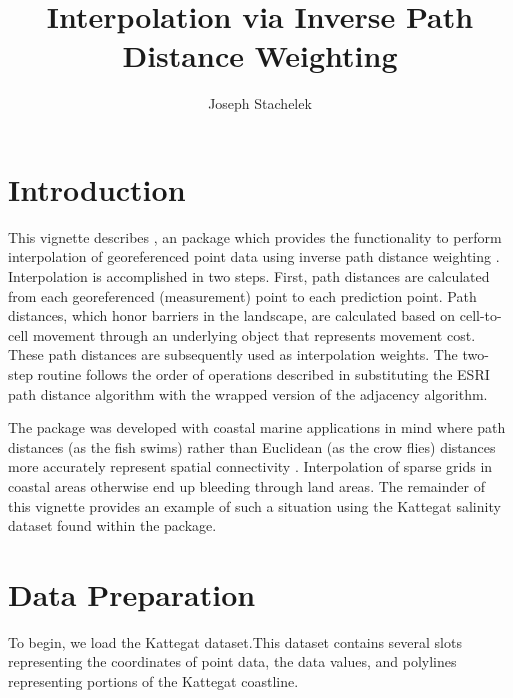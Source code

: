 \documentclass[nojss,shortnames]{jss}
\author{Joseph Stachelek}
\title{Interpolation via Inverse Path Distance Weighting}
\begin{document}


\section{Introduction}

This vignette describes , an  package which provides the functionality to perform interpolation of georeferenced point data using inverse path distance weighting \citep{suominen2010}. Interpolation is accomplished in two steps. First, path distances are calculated from each georeferenced (measurement) point to each prediction point. Path distances, which honor barriers in the landscape, are calculated based on cell-to-cell movement through an underlying   object \citep{hij2014} that represents movement cost. These path distances are subsequently used as interpolation weights. The two-step routine follows the order of operations described in \citet{suominen2010} substituting the ESRI path distance algorithm \citep{mitchell2012} with the  \citep{etten2014} wrapped version of the  \citep{csardi2006} adjacency algorithm.    

The  package was developed with coastal marine applications in mind where path distances (as the fish swims) rather than Euclidean (as the crow flies) distances more accurately represent spatial connectivity \citep{little1997}. Interpolation of sparse grids in coastal areas otherwise end up bleeding through land areas. The remainder of this vignette provides an example of such a situation using the Kattegat salinity dataset \citep{diggle2006} found within the  package.

\section{Data Preparation}

To begin, we load the Kattegat dataset.This dataset contains several slots representing the coordinates of point data, the data values, and polylines representing portions of the Kattegat coastline.
\newpage
\end{document}
